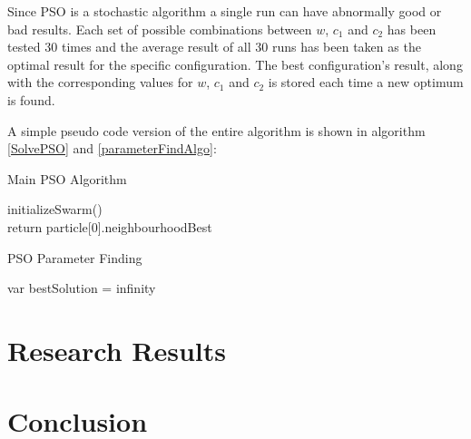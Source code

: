 \documentclass[hidelinks,english,conference]{IEEEtran}
\begin{document}
Since PSO is a stochastic algorithm a single run can have abnormally good or bad results. Each set of possible combinations between $w$, $c_{1}$ and $c_{2}$ has been tested 30 times and the average result of all 30 runs has been taken as the optimal result for the specific configuration. The best configuration's result, along with the corresponding values for $w$, $c_{1}$ and $c_{2}$ is stored each time a new optimum is found.

A simple pseudo code version of the entire algorithm is shown in algorithm \ref{SolvePSO} and \ref{parameterFindAlgo}:
\begin{algorithm}
\SetAlgoLined
\caption{Main PSO Algorithm}\label{SolvePSO}initializeSwarm()\\
return particle[0].neighbourhoodBest
\end{algorithm}

\begin{algorithm}
\SetAlgoLined
\caption{PSO Parameter Finding}\label{parameterFindAlgo}
var bestSolution = infinity
\end{algorithm}


\section{Research Results}



\section{Conclusion}




\end{document}

